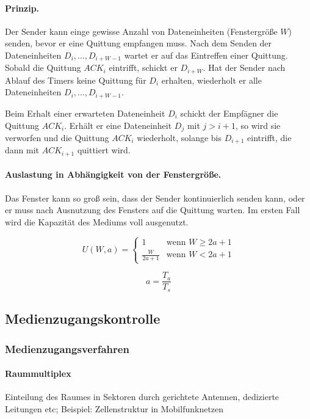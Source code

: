 \documentclass[]{scrartcl}
\begin{document}
\paragraph{Prinzip.} Der Sender kann einge gewisse Anzahl von Dateneinheiten (Fenstergr\"o{\ss}e $W$) senden, bevor er eine Quittung empfangen muss. Nach dem Senden der Dateneinheiten $D_{i}, \dots, D_{i+W-1}$ wartet er auf das Eintreffen einer Quittung. Sobald die Quittung $ACK_{i}$ eintrifft, schickt er $D_{i+W}$. Hat der Sender nach Ablauf des Timers keine Quittung f\"ur $D_{i}$ erhalten, wiederholt er alle Dateneinheiten $D_{i}, \dots, D_{i+W-1}$.

 Beim Erhalt einer erwarteten Dateneinheit $D_{i}$ schickt der Empf\"agner die Quittung $ACK_{i}$. Erh\"alt er eine Dateneinheit $D_{j}$ mit $j > i+1$, so wird sie verworfen und die Quittung $ACK_{i}$ wiederholt, solange bis $D_{i+1}$ eintrifft, die dann mit $ACK_{i+1}$ quittiert wird.


\paragraph{Auslastung in Abh\"angigkeit von der Fenstergr\"o{\ss}e.} Das Fenster kann so gro{\ss} sein, dass der Sender kontinuierlich senden kann, oder er muss nach Ausnutzung des Fensters auf die Quittung warten. Im ersten Fall wird die Kapazit\"at des Mediums voll ausgenutzt.

$$ U (W, a) =\left\{ \begin{array}{cl} 
	1 & \mbox{wenn } W \ge 2 a + 1 \\
	 \frac{W}{2a + 1} & \mbox{wenn } W < 2 a + 1
\end{array}\right. $$

$$a = \frac{T_{a}}{T_{s}}$$

\subsection{Medienzugangskontrolle}

\subsubsection{Medienzugangsverfahren}

\paragraph{Raummultiplex} Einteilung des Raumes in Sektoren durch gerichtete Antennen, dedizierte Leitungen etc; Beispiel: Zellenstruktur in Mobilfunknetzen
\end{document}
